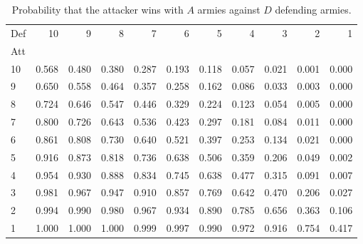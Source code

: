 \documentclass[12pt]{article}
\begin{document}
\begin{small}
    \begin{table}
        \centering
        \begin{tabular}{lrrrrrrrrrr}
            Def    & 10       & 9           & 8           & 7           & 6       & 5          & 4     & 3     & 2     & 1     \\ 
            Att    &          &             &             &             &         &            &       &       &       &       \\ 
            10     & 0.568    & 0.480       & 0.380       & 0.287       & 0.193   & 0.118      & 0.057 & 0.021 & 0.001 & 0.000 \\ 
            9      & 0.650    & 0.558       & 0.464       & 0.357       & 0.258   & 0.162      & 0.086 & 0.033 & 0.003 & 0.000 \\ 
            8      & 0.724    & 0.646       & 0.547       & 0.446       & 0.329   & 0.224      & 0.123 & 0.054 & 0.005 & 0.000 \\ 
            7      & 0.800    & 0.726       & 0.643       & 0.536       & 0.423   & 0.297      & 0.181 & 0.084 & 0.011 & 0.000 \\ 
            6      & 0.861    & 0.808       & 0.730       & 0.640       & 0.521   & 0.397      & 0.253 & 0.134 & 0.021 & 0.000 \\ 
            5      & 0.916    & 0.873       & 0.818       & 0.736       & 0.638   & 0.506      & 0.359 & 0.206 & 0.049 & 0.002 \\ 
            4      & 0.954    & 0.930       & 0.888       & 0.834       & 0.745   & 0.638      & 0.477 & 0.315 & 0.091 & 0.007 \\ 
            3      & 0.981    & 0.967       & 0.947       & 0.910       & 0.857   & 0.769      & 0.642 & 0.470 & 0.206 & 0.027 \\ 
            2      & 0.994    & 0.990       & 0.980       & 0.967       & 0.934   & 0.890      & 0.785 & 0.656 & 0.363 & 0.106 \\ 
            1      & 1.000    & 1.000       & 1.000       & 0.999       & 0.997   & 0.990      & 0.972 & 0.916 & 0.754 & 0.417 \\ 
        \end{tabular}
        \caption{Probability that the attacker wins with $ A $ armies
        against $ D $ defending armies.}%
        \label{tab:games:attackerwins}
    \end{table}
\end{small}
\end{document}
